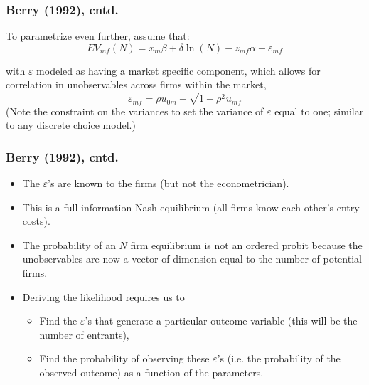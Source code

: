 \documentclass[aspectratio=169,11pt]{beamer}
\begin{document}
\begin{frame}
\frametitle{Berry (1992), cntd.}
To parametrize even further, assume that:\ \ 
\begin{equation}
EV_{mf}(N)=x_{m}\beta +\delta \ln (N)-z_{mf}\alpha -\varepsilon _{mf}
\label{entry6}
\end{equation}

with $\varepsilon $ modeled as having a market specific component, which
allows for correlation in unobservables across firms within the market, 
\begin{equation*}
\varepsilon _{mf}=\rho u_{0m}+\sqrt{1-\rho ^{2}}u_{mf}
\end{equation*}
(Note the constraint on the variances to set the variance of $\varepsilon $
equal to one; similar to any discrete choice model.)
\end{frame}
\begin{frame}

\frametitle{Berry (1992), cntd.}
\begin{itemize}
\item The $\varepsilon $'s are known to the firms (but not the
econometrician).

\item This is a full information Nash equilibrium (all firms know each
other's entry costs).

\item The probability of an $N$ firm equilibrium is not an ordered probit
because the unobservables are now a vector of dimension equal to the number
of potential firms.

\item Deriving the likelihood requires us to

\begin{itemize}
\item Find the $\varepsilon $'s that generate a particular outcome variable
(this will be the number of entrants),

\item Find the probability of observing these $\varepsilon $'s (i.e. the
probability of the observed outcome) as a function of the parameters.
\end{itemize}
\end{itemize}

\end{frame}
\end{document}
